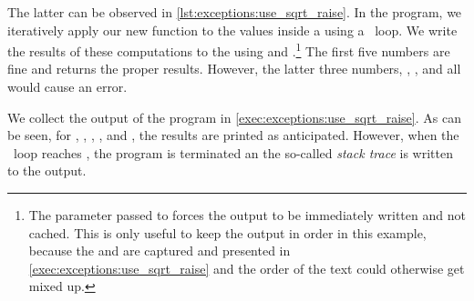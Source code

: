 The latter can be observed in \cref{lst:exceptions:use_sqrt_raise}.
In the program, we iteratively apply our new  function to the values inside a  using a ~loop.
We write the results of these computations to the  using  and .\footnote{%
The  parameter passed to  forces the output to be immediately written and not cached. %
This is only useful to keep the output in order in this example, because the  and  are captured and presented in \cref{exec:exceptions:use_sqrt_raise} and the order of the text could otherwise get mixed up.%
}
The first five numbers are fine and  returns the proper results.
However, the latter three numbers, , , and  all would cause an error.

We collect the output of the program in \cref{exec:exceptions:use_sqrt_raise}.
As can be seen, for , , , , and , the results are printed as anticipated.
However, when the ~loop reaches , the program is terminated an the so-called \emph{stack trace} is written to the output.

